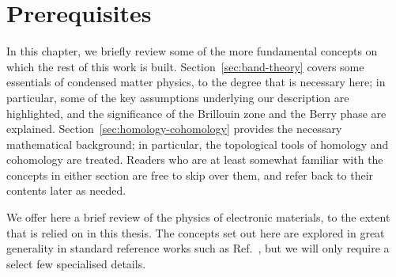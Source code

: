 \chapter{Prerequisites}\label{chap:prerequisites}

In this chapter, we briefly review some of the more fundamental concepts on which the rest of this work is built. Section~\ref{sec:band-theory} covers some essentials of condensed matter physics, to the degree that is necessary here; in particular, some of the key assumptions underlying our description are highlighted, and the significance of the Brillouin zone and the Berry phase are explained. Section~\ref{sec:homology-cohomology} provides the necessary mathematical background; in particular, the topological tools of homology and cohomology are treated. Readers who are at least somewhat familiar with the concepts in either section are free to skip over them, and refer back to their contents later as needed.

\label{sec:band-theory}

We offer here a brief review of the physics of electronic materials, to the extent that is relied on in this thesis. The concepts set out here are explored in great generality in standard reference works such as Ref.~\cite{AshcroftMermin_bands}, but we will only require a select few specialised details.

